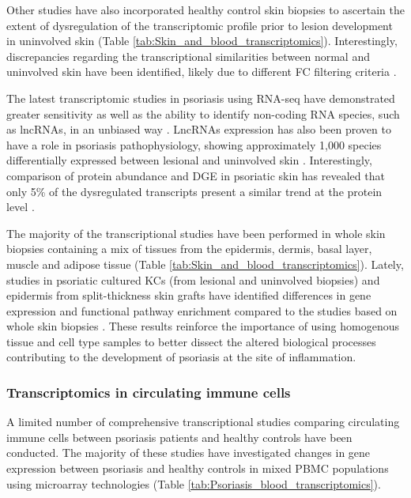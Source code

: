Other studies have also incorporated healthy control skin biopsies to ascertain the extent of dysregulation of the transcriptomic profile prior to lesion development in uninvolved skin (Table \ref{tab:Skin_and_blood_transcriptomics}). Interestingly, discrepancies regarding the transcriptional similarities between normal and uninvolved skin have been identified, likely due to different FC filtering criteria \parencite{Keermann2015, Tsoi2015}.%

The latest transcriptomic studies in psoriasis using RNA-seq have demonstrated greater sensitivity as well as the ability to identify non-coding RNA species, such as lncRNAs, in an unbiased way \parencite{Jaabari2011, Li2014}. LncRNAs expression has also been proven to have a role in psoriasis pathophysiology, showing approximately 1,000 species differentially expressed between lesional and uninvolved skin \parencite{Tsoi2015}. Interestingly, comparison of protein abundance and DGE in psoriatic skin has revealed that only 5\% of the dysregulated transcripts present a similar trend at the protein level \parencite{Swindell2015}.   

The majority of the transcriptional studies have been performed in whole skin biopsies containing a mix of tissues from the epidermis, dermis, basal layer, muscle and adipose tissue (Table \ref{tab:Skin_and_blood_transcriptomics}). Lately, studies in psoriatic cultured KCs (from lesional and uninvolved biopsies) and epidermis from split-thickness skin grafts have identified differences in gene expression and functional pathway enrichment compared to the studies based on whole skin biopsies \parencite{Swindell2017,Tervaniemi2016}. These results reinforce the importance of using homogenous tissue and cell type samples to better dissect the altered biological processes contributing to the development of psoriasis at the site of inflammation. 


\subsubsection{Transcriptomics in circulating immune cells}
A limited number of comprehensive transcriptional studies comparing circulating immune cells between psoriasis patients and healthy controls have been conducted. The majority of these studies have investigated changes in gene expression between psoriasis and healthy controls in mixed PBMC populations using microarray technologies (Table \ref{tab:Psoriasis_blood_transcriptomics}). 


